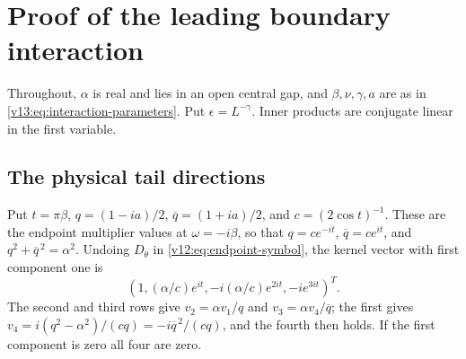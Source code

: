 \section{Proof of the leading boundary interaction}
\label{v13:app:boundary-interaction}

Throughout, $\alpha$ is real and lies in an open central gap, and
$\beta,\nu,\gamma,a$ are as in
\eqref{v13:eq:interaction-parameters}.  Put $\epsilon=L^{-\gamma}$.
Inner products are conjugate linear in the first variable.

\subsection{The physical tail directions}

Put $t=\pi\beta$, $q=(1-ia)/2$, $\overline q=(1+ia)/2$, and
$c=(2\cos t)^{-1}$.  These are the endpoint multiplier values at
$\omega=-i\beta$, so that $q=ce^{-it}$, $\overline q=ce^{it}$, and
$q^2+\overline q^{\,2}=\alpha^2$.  Undoing $D_\theta$ in
\eqref{v12:eq:endpoint-symbol}, the kernel vector with first
component one is
\[
 (1,(\alpha/c)e^{it},-i(\alpha/c)e^{2it},-ie^{3it})^T.
\]
The second and third rows give $v_2=\alpha v_1/q$ and
$v_3=\alpha v_4/\overline q$; the first gives
$v_4=i(q^2-\alpha^2)/(cq)=-i\overline q^{\,2}/(cq)$, and the fourth then holds.
If the first component is zero all four are zero.

